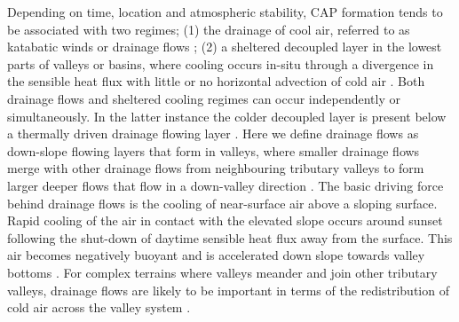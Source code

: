 \documentclass[times]{qjrms4}
\begin{document}
Depending on time, location and atmospheric stability, CAP formation tends to be associated with two regimes; (1) the drainage of cool air, referred to as katabatic winds \citep{heywood1933katabatic,manins1979katabatic} or drainage flows \citep{gudiksen1992measurements}; (2) a sheltered decoupled layer in the lowest parts of valleys or basins, where cooling occurs in-situ through a divergence in the sensible heat flux with little or no horizontal advection of cold air \citep{vosper2008numerical}. Both drainage flows and sheltered cooling regimes can occur independently or simultaneously. In the latter instance the colder decoupled layer is present below a thermally driven drainage flowing layer \citep{clements2003cold,Vosper2013narrow}. Here we define drainage flows as down-slope flowing layers that form in valleys, where smaller drainage flows merge with other drainage flows from neighbouring tributary valleys to form larger deeper flows that flow in a down-valley direction \citep{orgill1992mesoscale,Vosper2013narrow}. The basic driving force behind drainage flows is the cooling of near-surface air above a sloping surface. Rapid cooling of the air in contact with the elevated slope occurs around sunset following the shut-down of daytime sensible heat flux away from the surface. This air becomes negatively buoyant and is accelerated down slope towards valley bottoms \citep{vosper2008numerical,gudiksen1992measurements,Vosper2013narrow}. For complex terrains where valleys meander and join other tributary valleys, drainage flows are likely to be important in terms of the redistribution of cold air across the valley system \citep{vosper2008numerical}.
\end{document}
